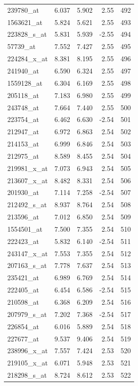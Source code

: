 \begin{footnotesize}
\begin{longtable}{lrrrr}
239780\_at & 6.037 & 5.902 & 2.55 & 492 \\
1563621\_at & 5.824 & 5.621 & 2.55 & 493 \\
223828\_s\_at & 5.831 & 5.939 & -2.55 & 494 \\
57739\_at & 7.552 & 7.427 & 2.55 & 495 \\
224284\_x\_at & 8.381 & 8.195 & 2.55 & 496 \\
241940\_at & 6.590 & 6.324 & 2.55 & 497 \\
1559128\_at & 6.304 & 6.169 & 2.55 & 498 \\
205118\_at & 7.183 & 6.980 & 2.55 & 499 \\
243748\_at & 7.664 & 7.440 & 2.55 & 500 \\
223754\_at & 6.462 & 6.630 & -2.54 & 501 \\
212947\_at & 6.972 & 6.863 & 2.54 & 502 \\
214153\_at & 6.999 & 6.846 & 2.54 & 503 \\
212975\_at & 8.589 & 8.455 & 2.54 & 504 \\
219981\_x\_at & 7.073 & 6.943 & 2.54 & 505 \\
213607\_x\_at & 8.482 & 8.331 & 2.54 & 506 \\
201930\_at & 7.114 & 7.258 & -2.54 & 507 \\
212492\_s\_at & 8.937 & 8.764 & 2.54 & 508 \\
213596\_at & 7.012 & 6.850 & 2.54 & 509 \\
1554501\_at & 7.500 & 7.355 & 2.54 & 510 \\
222423\_at & 5.832 & 6.140 & -2.54 & 511 \\
243147\_x\_at & 7.553 & 7.355 & 2.54 & 512 \\
207163\_s\_at & 7.778 & 7.637 & 2.54 & 513 \\
235421\_at & 6.989 & 6.769 & 2.54 & 514 \\
222405\_at & 6.454 & 6.586 & -2.54 & 515 \\
210598\_at & 6.368 & 6.209 & 2.54 & 516 \\
207979\_s\_at & 7.202 & 7.368 & -2.54 & 517 \\
226854\_at & 6.016 & 5.889 & 2.54 & 518 \\
227677\_at & 9.537 & 9.406 & 2.54 & 519 \\
238996\_x\_at & 7.557 & 7.424 & 2.53 & 520 \\
219105\_x\_at & 6.071 & 5.948 & 2.53 & 521 \\
218298\_s\_at & 8.724 & 8.612 & 2.53 & 522 \\

\end{longtable}
\end{footnotesize}
